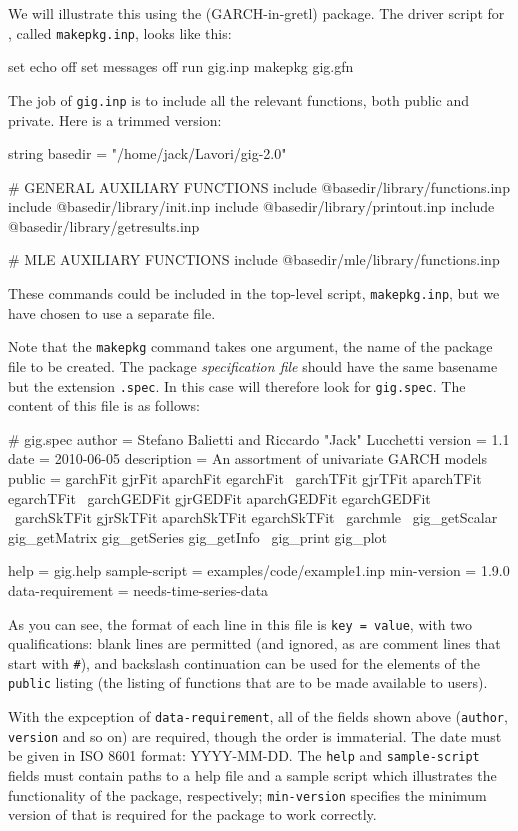 We will illustrate this using the  (GARCH-in-gretl) package.
The driver script for , called \texttt{makepkg.inp}, looks
like this:
%
\begin{code}
set echo off
set messages off
run gig.inp
makepkg gig.gfn
\end{code}

The job of \texttt{gig.inp} is to include all the relevant functions,
both public and private. Here is a trimmed version:
%
\begin{code}
string basedir = "/home/jack/Lavori/gig-2.0"

# GENERAL AUXILIARY FUNCTIONS
include @basedir/library/functions.inp
include @basedir/library/init.inp
include @basedir/library/printout.inp
include @basedir/library/getresults.inp

# MLE AUXILIARY FUNCTIONS
include @basedir/mle/library/functions.inp
\end{code}
%
These commands could be included in the top-level script,
\texttt{makepkg.inp}, but we have chosen to use a separate file.

Note that the \texttt{makepkg} command takes one argument, the name of
the package file to be created. The package \emph{specification file}
should have the same basename but the extension \texttt{.spec}. In
this case  will therefore look for \texttt{gig.spec}. The
content of this file is as follows:
%
\begin{code}
# gig.spec
author = Stefano Balietti and Riccardo "Jack" Lucchetti
version = 1.1
date = 2010-06-05
description = An assortment of univariate GARCH models
public = garchFit gjrFit aparchFit egarchFit \
    garchTFit gjrTFit aparchTFit egarchTFit \
    garchGEDFit gjrGEDFit aparchGEDFit egarchGEDFit \
    garchSkTFit gjrSkTFit aparchSkTFit egarchSkTFit \
    garchmle \
    gig_getScalar gig_getMatrix gig_getSeries gig_getInfo \
    gig_print gig_plot

help = gig.help
sample-script = examples/code/example1.inp
min-version = 1.9.0
data-requirement = needs-time-series-data
\end{code}

As you can see, the format of each line in this file is \texttt{key =
  value}, with two qualifications: blank lines are permitted (and
ignored, as are comment lines that start with \verb|#|), and backslash
continuation can be used for the elements of the \texttt{public}
listing (the listing of functions that are to be made available to
users).  

With the expception of \texttt{data-requirement}, all of the fields
shown above (\texttt{author}, \texttt{version} and so on) are
required, though the order is immaterial. The date must be given in
ISO 8601 format: YYYY-MM-DD. The \texttt{help} and
\texttt{sample-script} fields must contain paths to a help file and a
sample script which illustrates the functionality of the package,
respectively; \texttt{min-version} specifies the minimum version of
\app{gretl} that is required for the package to work correctly.  

